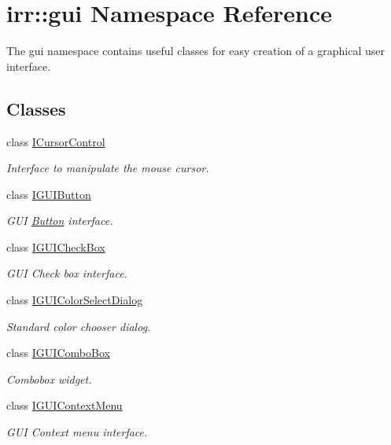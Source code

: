 \hypertarget{namespaceirr_1_1gui}{}\section{irr\+:\+:gui Namespace Reference}
\label{namespaceirr_1_1gui}


The gui namespace contains useful classes for easy creation of a graphical user interface.  


\subsection*{Classes}
\begin{DoxyCompactItemize}
\item 
class \hyperlink{classirr_1_1gui_1_1ICursorControl}{I\+Cursor\+Control}
\begin{DoxyCompactList}\small\item\em Interface to manipulate the mouse cursor. \end{DoxyCompactList}\item 
class \hyperlink{classirr_1_1gui_1_1IGUIButton}{I\+G\+U\+I\+Button}
\begin{DoxyCompactList}\small\item\em G\+UI \hyperlink{classButton}{Button} interface. \end{DoxyCompactList}\item 
class \hyperlink{classirr_1_1gui_1_1IGUICheckBox}{I\+G\+U\+I\+Check\+Box}
\begin{DoxyCompactList}\small\item\em G\+UI Check box interface. \end{DoxyCompactList}\item 
class \hyperlink{classirr_1_1gui_1_1IGUIColorSelectDialog}{I\+G\+U\+I\+Color\+Select\+Dialog}
\begin{DoxyCompactList}\small\item\em Standard color chooser dialog. \end{DoxyCompactList}\item 
class \hyperlink{classirr_1_1gui_1_1IGUIComboBox}{I\+G\+U\+I\+Combo\+Box}
\begin{DoxyCompactList}\small\item\em Combobox widget. \end{DoxyCompactList}\item 
class \hyperlink{classirr_1_1gui_1_1IGUIContextMenu}{I\+G\+U\+I\+Context\+Menu}
\begin{DoxyCompactList}\small\item\em G\+UI Context menu interface. \end{DoxyCompactList}\item 

\end{DoxyCompactItemize}

